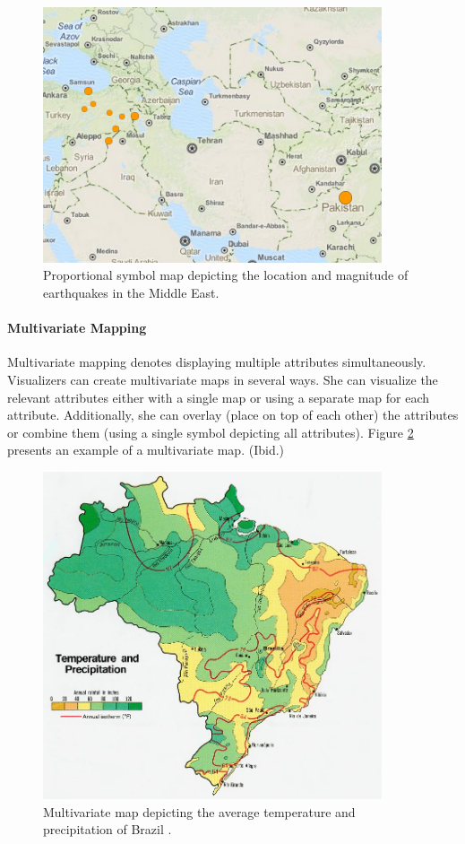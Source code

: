 \begin{figure}[htbp]
  \begin{center}
    \includegraphics[width=10cm]{images/proportionalsymbol-example.png}
    \caption{Proportional symbol map depicting the location and magnitude of earthquakes in the Middle East. \citep{globalincidentmap_live_2014}}
    \label{fig:proportionalsymbol}
  \end{center}
\end{figure}

\paragraph{Multivariate Mapping}

Multivariate mapping denotes displaying multiple attributes simultaneously. Visualizers can create multivariate maps in several ways. She can visualize the relevant attributes either with a single map or using a separate map for each attribute. Additionally, she can overlay (place on top of each other) the attributes or combine them (using a single symbol depicting all attributes). Figure \ref{fig:multivariate} presents an example of a multivariate map. (Ibid.)

\begin{figure}[htbp]
  \begin{center}
    \includegraphics[width=10cm]{images/multivariate-example.jpg}
    \caption{Multivariate map depicting the average temperature and precipitation of Brazil \citep{central_intelligence_agency_temperature_1977}.}
    \label{fig:multivariate}
  \end{center}
\end{figure}

